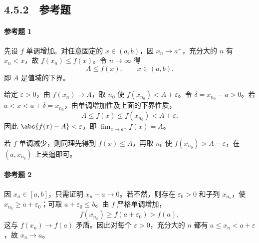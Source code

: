 \subsection*{4.5.2　参考题}

\paragraph{参考题 1}
\begin{xsolution}
先设 $f$ 单调增加。对任意固定的 $x\in(a,b)$，因 $x_n\to a^+$，充分大的 $n$ 有 $x_n<x$，故
$f(x_n)\leq f(x)$。令 $n\to\infty$ 得
\[
  A\leq f(x),\qquad x\in(a,b).
\]
即 $A$ 是值域的下界。

给定 $\varepsilon>0$，由 $f(x_n)\to A$，取 $n_0$ 使
$f(x_{n_0})<A+\varepsilon$。令 $\delta=x_{n_0}-a>0$。若
$a<x<a+\delta=x_{n_0}$，由单调增加性及上面的下界性质，
\[
  A\leq f(x)\leq f(x_{n_0})<A+\varepsilon.
\]
因此 $\abs{f(x)-A}<\varepsilon$，即 $\lim_{x\to a^+}f(x)=A$。

若 $f$ 单调减少，则同理先得到 $f(x)\leq A$，再取 $n_0$ 使
$f(x_{n_0})>A-\varepsilon$，在 $(a,x_{n_0})$ 上夹逼即可。
\end{xsolution}

\paragraph{参考题 2}
\begin{xsolution}
因 $x_n\in[a,b]$，只需证明 $x_n-a\to0$。若不然，则存在 $\varepsilon_0>0$ 和子列 $x_{n_k}$，使
$x_{n_k}\geq a+\varepsilon_0$；可取 $a+\varepsilon_0\leq b$。由 $f$ 严格单调增加，
\[
  f(x_{n_k})\geq f(a+\varepsilon_0)>f(a),
\]
这与 $f(x_n)\to f(a)$ 矛盾。因此对每个 $\varepsilon>0$，充分大的 $n$ 都有
$a\leq x_n<a+\varepsilon$，故 $x_n\to a$。
\end{xsolution}

